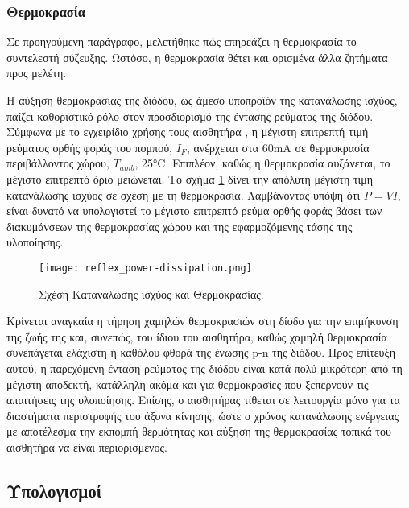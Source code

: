 \subsubsection{Θερμοκρασία}

Σε προηγούμενη παράγραφο, μελετήθηκε πώς επηρεάζει η θερμοκρασία το συντελεστή
σύζευξης. Ωστόσο, η θερμοκρασία θέτει και ορισμένα άλλα ζητήματα προς μελέτη.

Η αύξηση θερμοκρασίας της διόδου, ως άμεσο υποπροϊόν της κατανάλωσης ισχύος,
παίζει καθοριστικό ρόλο στον προσδιορισμό της έντασης ρεύματος της διόδου.
Σύμφωνα με το εγχειρίδιο χρήσης τους αισθητήρα \parencite{vishay09}, η μέγιστη
επιτρεπτή τιμή ρεύματος ορθής φοράς του πομπού, $I_F$, ανέρχεται στα 60mA σε
θερμοκρασία περιβάλλοντος χώρου, $T_{amb}$, 25°C. Επιπλέον, καθώς η θερμοκρασία
αυξάνεται, το μέγιστο επιτρεπτό όριο μειώνεται.
Το σχήμα \ref{fig:reflex:power-dissipation} δίνει την απόλυτη μέγιστη τιμή
κατανάλωσης ισχύος σε σχέση με τη θερμοκρασία. Λαμβάνοντας υπόψη ότι $P = VI$,
είναι δυνατό να υπολογιστεί το μέγιστο επιτρεπτό ρεύμα ορθής φοράς βάσει των
διακυμάνσεων της θερμοκρασίας χώρου και της εφαρμοζόμενης τάσης της υλοποίησης.

\begin{figure}
    \caption{Σχέση Κατανάλωσης ισχύος και Θερμοκρασίας.
    \label{fig:reflex:power-dissipation}}
    \begin{center}%
    \texttt{[image: reflex\_power-dissipation.png]}
    \end{center}

\end{figure}

Κρίνεται αναγκαία η τήρηση χαμηλών θερμοκρασιών στη δίοδο για την επιμήκυνση της
ζωής της και, συνεπώς, του ίδιου του αισθητήρα, καθώς χαμηλή θερμοκρασία
συνεπάγεται ελάχιστη ή καθόλου φθορά της ένωσης p-n της διόδου. Προς επίτευξη
αυτού, η παρεχόμενη ένταση ρεύματος της διόδου είναι κατά πολύ μικρότερη από τη
μέγιστη αποδεκτή, κατάλληλη ακόμα και για θερμοκρασίες που ξεπερνούν τις
απαιτήσεις της υλοποίησης. Επίσης, ο αισθητήρας τίθεται σε λειτουργία μόνο για
τα διαστήματα περιστροφής του άξονα κίνησης, ώστε ο χρόνος κατανάλωσης ενέργειας
με αποτέλεσμα την εκπομπή θερμότητας και αύξηση της θερμοκρασίας τοπικά του
αισθητήρα να είναι περιορισμένος.


\subsection{Υπολογισμοί}
\label{subsec:reflex:calculations}


